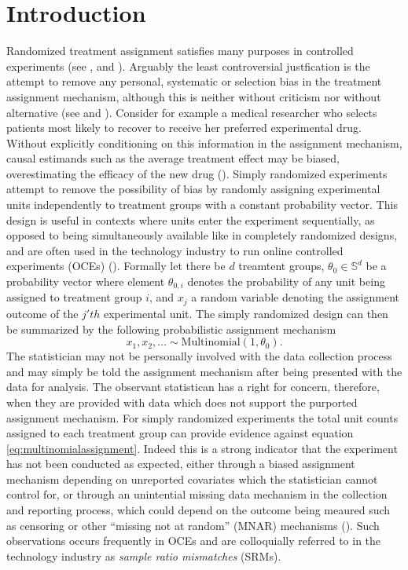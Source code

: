 \documentclass[11pt]{article}
\begin{document}
\section{Introduction}
\label{sec:intro}
Randomized treatment assignment satisfies many purposes in controlled experiments (see \cite{kempthorne}, \cite{cox} and \cite{rubin}). Arguably the least controversial justfication is the attempt to remove any personal, systematic or selection bias in the treatment assignment mechanism, although this is neither without criticism nor without alternative (see \cite{lindley} and \cite{kadane}). Consider for example a medical researcher who selects patients most likely to recover to receive her preferred experimental drug. Without explicitly conditioning on this information in the assignment mechanism, causal estimands such as the average treatment effect may be biased, overestimating the efficacy of the new drug (\cite{berry}).
Simply randomized experiments attempt to remove the possibility of bias by randomly assigning experimental units independently to treatment groups with a constant probability vector.
This design is useful in contexts where units enter the experiment sequentially, as opposed to being simultaneously available like in completely randomized designs, and are often used in the technology industry to run online controlled experiments (OCEs) (\cite{oce}). Formally let there be $d$ treamtent groups, $\theta_0 \in \mathbb{S}^d$ be a probability vector where element $\theta_{0,i}$ denotes the probability of any unit being assigned to treatment group $i$, and $x_j$ a random variable denoting the assignment outcome of the $j'th$ experimental unit. The simply randomized design can then be summarized by the following probabilistic assignment mechanism
\begin{equation}
  \label{eq:multinomialassignment}
  x_1,x_2, \dots \sim \text{Multinomial}(1,\theta_0).
\end{equation}
The statistician may not be personally involved with the data collection process and may simply be told the assignment mechanism after being presented with the data for analysis. The observant statistican has a right for concern, therefore, when they are provided with data which does not support the purported assignment mechanism. For simply randomized experiments the total unit counts assigned to each treatment group can provide evidence against equation \eqref{eq:multinomialassignment}.
Indeed this is a strong indicator that the experiment has not been conducted as expected, either through a biased assignment mechanism depending on unreported covariates which the statistician cannot control for, or through an unintential missing data mechanism in the collection and reporting process, which could depend on the outcome being meaured such as censoring or other ``missing not at random'' (MNAR) mechanisms (\cite{missing-data}).
Such observations occurs frequently in OCEs and are colloquially referred to in the technology industry as \textit{sample ratio mismatches} (SRMs).
\end{document}
